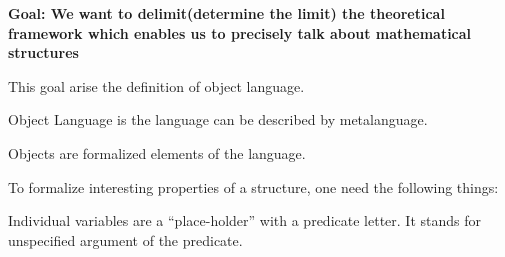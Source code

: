 \documentclass[11pt]{article}
\begin{document}
\begin{center}
\end{center}

\textbf{Goal: We want to delimit(determine the limit) the theoretical framework which enables us to precisely talk about mathematical structures}

This goal arise the definition of object language.
\begin{definition}
Object Language is the language can be described by metalanguage.
\end{definition}

\begin{definition}
Objects are formalized elements of the language.
\end{definition}

To formalize interesting properties of a structure, one need the following things:

\begin{definition}
Individual variables are a ``place-holder'' with a predicate letter. It stands for unspecified argument of the predicate.
\end{definition}
\end{document}
